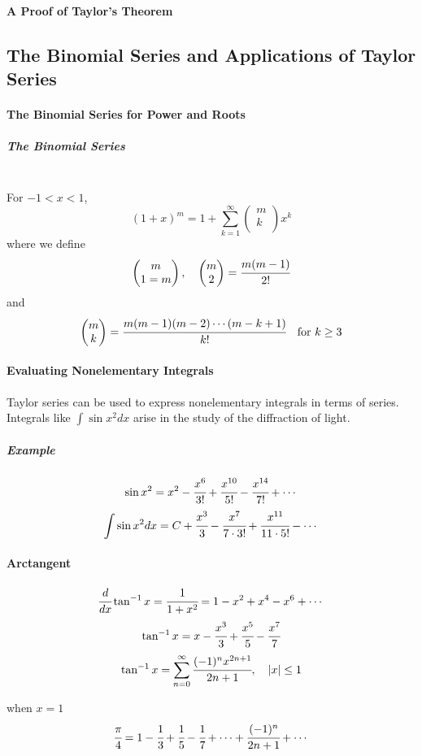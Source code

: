 \documentclass{article}
\begin{document}
            \paragraph{A Proof of Taylor's Theorem}
        \subsection{The Binomial Series and Applications of Taylor Series}
            \paragraph{The Binomial Series for Power and Roots}
                \subparagraph{The Binomial Series}
                \text{}\\
                For $-1<x<1$,
                \[(1+x)^m=1+\sum_{k=1}^\infty
                    \begin{pmatrix}
                        m\\
                        k\\
                    \end{pmatrix}
                x^k
                \]
                where we define
                \[\begin{pmatrix}
                    m\\1=m
                \end{pmatrix},\quad
                \begin{pmatrix}
                    m\\2
                \end{pmatrix}=\cfrac{m(m-1)}{2!}\]
                and
                \[\begin{pmatrix}
                    m\\k
                \end{pmatrix}=\cfrac{m(m-1)(m-2)\cdots(m-k+1)}{k!}\quad \text{for }k\ge 3\]
            \paragraph{Evaluating Nonelementary Integrals}
                Taylor series can be used to express nonelementary integrals in terms of series. Integrals like $\int \sin x^2 dx$ arise in the study of the diffraction of light.
                \subparagraph{Example}
                \[\sin x^2=x^2-\cfrac{x^6}{3!}+\cfrac{x^{10}}{5!}-\cfrac{x^{14}}{7!}+\cdots\]
                \[\int\sin x^2 dx=C+\cfrac{x^3}{3}-\cfrac{x^7}{7\cdot 3!}+\cfrac{x^{11}}{11\cdot 5!}-\cdots\]
            \paragraph{Arctangent}
                \[\cfrac{d}{dx}\tan^{-1}x=\cfrac{1}{1+x^2}=1-x^2+x^4-x^6+\cdots\]
                \[\tan^{-1}x=x-\cfrac{x^3}{3}+\cfrac{x^5}{5}-\cfrac{x^7}{7}\]
                \[\tan^{-1}x=\sum_{n=0}^\infty\cfrac{(-1)^nx^{2n+1}}{2n+1},\quad |x|\le 1\]
                \par when $x=1$
                \[\cfrac{\pi}{4}=1-\cfrac{1}{3}+\cfrac{1}{5}-\cfrac{1}{7}+\cdots+\cfrac{(-1)^n}{2n+1}+\cdots\]
\end{document}
